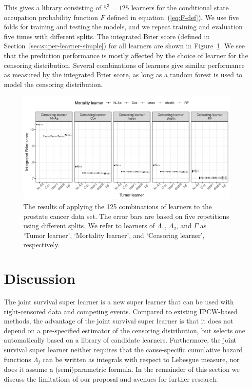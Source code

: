 \documentclass[a4paper,danish]{article}
\theoremstyle{plain} %
\numberwithin{theorem}{section}
\theoremstyle{definition} %
\theoremstyle{remark}
\newcommand{\1}{\mathds{1}}
\begin{document}
This gives a library consisting of \( 5^3 = 125 \) learners for the
conditional state occupation probability function \( F \) defined in
equation~(\ref{eq:F-def}). We use five folds for training and testing
the models, and we repeat training and evaluation five times with
different splits.  The integrated Brier score (defined in
Section~\ref{sec:super-learner-simple}) for all learners are shown in
Figure~\ref{fig:zelefski-real}. We see that the prediction
performance is mostly affected by the choice of learner for the
censoring distribution. Several combinations of learners give similar
performance as measured by the integrated Brier score, as long as a
random forest is used to model the censoring distribution.

\begin{figure}
  \centering %
  \includegraphics[width=1\linewidth]{real-data-state-learner.pdf}
  \caption[]{The results of applying the 125 combinations of learners to the
    prostate cancer data set. The error bars are based on five repetitions using
    different splits. We refer to learners of \( \Lambda_1 \), \( \Lambda_2 \),
    and $\Gamma$ as `Tumor learner', `Mortality learner', and `Censoring
    learner', respectively.}
  \label{fig:zelefski-real}
\end{figure}


\section{Discussion}
\label{sec:discussion}

The joint survival super learner is a new super learner that can be used with
right-censored data and competing events. Compared to existing
IPCW-based methods, the advantage of the joint survival super learner is that
it does not depend on a pre-specified estimator of the
censoring distribution, but selects one automatically based on
a library of candidate learners. Furthermore, the joint survival super learner neither requires that the cause-specific cumulative
hazard functions \( \Lambda_j \) can be written as integrals
with respect to Lebesgue measure, nor does it assume a
(semi)parametric formula. In the remainder of this section
we discuss the limitations of our proposal and avenues for
further research.
\end{document}
